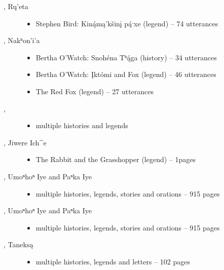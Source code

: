 \documentclass[output=paper]{LSP/langsci}
\begin{document}
\begin{description}

\item[\citet{Carter1991}, Rų’eta]\hfill
\begin{itemize}
\item Stephen Bird: Kin\'ąmą’kšinį p\'ąˑxe (legend) -- 74 utterances
\end{itemize}

\item[\citet{Cumberland2005}, Nakʰon’i’a]\hfill
\begin{itemize}
\item Bertha O’Watch: Snohéna Tʰ\'ąga (history) -- 34 utterances
\item Bertha O’Watch: Įktómi and Fox (legend) -- 46 utterances
\item The Red Fox (legend) -- 27 utterances
\end{itemize}

\item[\citet{Deloria1932}, ]\hfill
\begin{itemize}
\item multiple histories and legends
\end{itemize}

\item[\citet{Dorsey1880}, Jiwere Ich\^{}e]\hfill
\begin{itemize}
\item The Rabbit and the Grasshopper (legend) -- 1\textonehalf{}pages
\end{itemize}

\item[\citet{Dorsey1890}, Umoⁿhoⁿ Iye and Paⁿka Iye]\hfill
\begin{itemize}
\item multiple histories, legends, stories and orations -- 915 pages
\end{itemize}

\item[\citet{Dorsey1891}, Umoⁿhoⁿ Iye and Paⁿka Iye]\hfill
\begin{itemize}
\item multiple histories, legends, stories and orations -- 915 pages
\end{itemize}

\item[\citet{DorseySwanton1912}, Taneksą]\hfill
\begin{itemize}
\item multiple histories, legends and letters -- 102 pages
\end{itemize}


\end{description}
\end{document}
